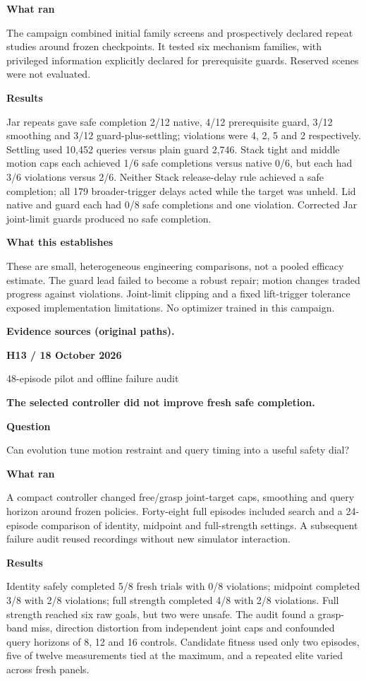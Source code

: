 \documentclass[11pt,a4paper]{article}
\newcommand{\block}[2]{\par\textbf{\color{ink}#1}\par\nopagebreak #2\par}
\newcommand{\finding}[1]{\begin{tcolorbox}[colback=pale,colframe=pale,boxrule=0pt,arc=1mm,left=10pt,right=10pt,top=10pt,bottom=10pt]\color{ink}\large\bfseries #1\end{tcolorbox}}
\begin{document}
\block{What ran}{The campaign combined initial family screens and prospectively declared repeat studies around frozen checkpoints. It tested six mechanism families, with privileged information explicitly declared for prerequisite guards. Reserved scenes were not evaluated.}
\block{Results}{Jar repeats gave safe completion 2/12 native, 4/12 prerequisite guard, 3/12 smoothing and 3/12 guard-plus-settling; violations were 4, 2, 5 and 2 respectively. Settling used 10,452 queries versus plain guard 2,746. Stack tight and middle motion caps each achieved 1/6 safe completions versus native 0/6, but each had 3/6 violations versus 2/6. Neither Stack release-delay rule achieved a safe completion; all 179 broader-trigger delays acted while the target was unheld. Lid native and guard each had 0/8 safe completions and one violation. Corrected Jar joint-limit guards produced no safe completion.}
\block{What this establishes}{These are small, heterogeneous engineering comparisons, not a pooled efficacy estimate. The guard lead failed to become a robust repair; motion changes traded progress against violations. Joint-limit clipping and a fixed lift-trigger tolerance exposed implementation limitations. No optimizer trained in this campaign.}
\vfill{\footnotesize\color{muted}\textbf{Evidence sources (original paths).}\par
\raggedright {}\par {}}
\clearpage
{}\label{exp:H13}
{\color{accent}\small\bfseries H13 / 18 October 2026}\par
{}\par
{\color{muted}\small 48-episode pilot and offline failure audit}\par\vspace{2mm}
\finding{The selected controller did not improve fresh safe completion.}
\block{Question}{Can evolution tune motion restraint and query timing into a useful safety dial?}
\block{What ran}{A compact controller changed free/grasp joint-target caps, smoothing and query horizon around frozen policies. Forty-eight full episodes included search and a 24-episode comparison of identity, midpoint and full-strength settings. A subsequent failure audit reused recordings without new simulator interaction.}
\block{Results}{Identity safely completed 5/8 fresh trials with 0/8 violations; midpoint completed 3/8 with 2/8 violations; full strength completed 4/8 with 2/8 violations. Full strength reached six raw goals, but two were unsafe. The audit found a grasp-band miss, direction distortion from independent joint caps and confounded query horizons of 8, 12 and 16 controls. Candidate fitness used only two episodes, five of twelve measurements tied at the maximum, and a repeated elite varied across fresh panels.}
\end{document}
